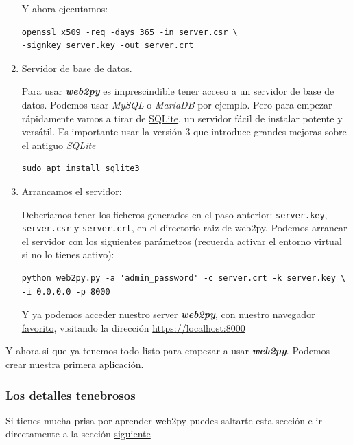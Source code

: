 \documentclass[
  12pt,
  spanish,
]{article}
\begin{document}
\begin{enumerate}
  Y ahora ejecutamos:

\begin{verbatim}
openssl x509 -req -days 365 -in server.csr \
-signkey server.key -out server.crt
\end{verbatim}
\item
  Servidor de base de datos.

  Para usar \textbf{\emph{web2py}} es imprescindible tener acceso a un
  servidor de base de datos. Podemos usar \emph{MySQL} o \emph{MariaDB}
  por ejemplo. Pero para empezar rápidamente vamos a tirar de
  \href{https://www.sqlite.org/version3.html}{SQLite}, un servidor fácil
  de instalar potente y versátil. Es importante usar la versión 3 que
  introduce grandes mejoras sobre el antiguo \emph{SQLite}

\begin{verbatim}
sudo apt install sqlite3
\end{verbatim}
\item
  Arrancamos el servidor:

  Deberíamos tener los ficheros generados en el paso anterior:
  \texttt{server.key}, \texttt{server.csr} y \texttt{server.crt}, en el
  directorio raiz de web2py. Podemos arrancar el servidor con los
  siguientes parámetros (recuerda activar el entorno virtual si no lo
  tienes activo):

\begin{verbatim}
python web2py.py -a 'admin_password' -c server.crt -k server.key \
-i 0.0.0.0 -p 8000
\end{verbatim}

  Y ya podemos acceder nuestro server \textbf{\emph{web2py}}, con
  nuestro
  \href{https://www.mozilla.org/en-US/firefox/developer/}{navegador
  favorito}, visitando la dirección \url{https://localhost:8000}
\end{enumerate}

Y ahora si que ya tenemos todo listo para empezar a usar
\textbf{\emph{web2py}}. Podemos crear nuestra primera aplicación.

\hypertarget{los-detalles-tenebrosos}{%
\subsubsection{Los detalles tenebrosos}\label{los-detalles-tenebrosos}}

Si tienes mucha prisa por aprender web2py puedes saltarte esta sección e
ir directamente a la sección
\protect\hyperlink{nuestra-primera-aplicaciuxf3n}{siguiente}
\end{document}
